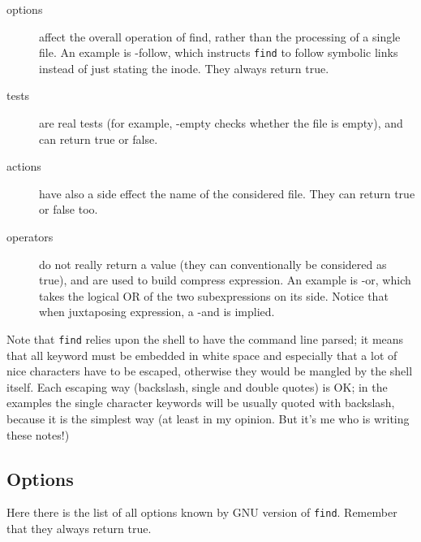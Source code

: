 \begin{description}

\item [options] affect the overall operation of find, rather than the
processing of a single file. An example is {\sf -follow}, which instructs
{\tt find} to follow symbolic links instead of just stating the inode.
They always return true.

\item [tests] are real tests (for example, {\sf -empty} checks whether the
file is empty), and can return true or false.

\item [actions] have also a side effect
the name of the considered file. They can return true or false too.

\item [operators] do not really return a value (they can conventionally be
considered as true), and are used to build compress expression. An example
is {\sf -or}, which takes the logical OR of the two subexpressions on its
side. Notice that when juxtaposing expression, a -and is implied.

\end{description}

Note that {\tt find} relies upon the shell to have the command line parsed;
it means that all keyword must be embedded in white space and especially
that a lot of nice characters have to be escaped, otherwise they would be
mangled by the shell itself. Each escaping way (backslash, single and
double quotes) is OK; in the examples the single character keywords will be
usually quoted with backslash, because it is the simplest way (at least in 
my opinion. But it's me who is writing these notes!)

\subsection{Options}

Here there is the list of all options known by GNU version of {\tt find}.
Remember that they always return true. 

